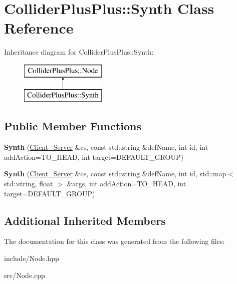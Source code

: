 \hypertarget{classColliderPlusPlus_1_1Synth}{\section{Collider\-Plus\-Plus\-:\-:Synth Class Reference}
\label{classColliderPlusPlus_1_1Synth}
}
Inheritance diagram for Collider\-Plus\-Plus\-:\-:Synth\-:\begin{figure}[H]
\begin{center}
\leavevmode
\includegraphics[height=2.000000cm]{classColliderPlusPlus_1_1Synth}
\end{center}
\end{figure}
\subsection*{Public Member Functions}
\begin{DoxyCompactItemize}
\item 
\hypertarget{classColliderPlusPlus_1_1Synth_ac3f806d2e0109543b2e511a7b5b2fe79}{{\bfseries Synth} (\hyperlink{classColliderPlusPlus_1_1Client__Server}{Client\-\_\-\-Server} \&cs, const std\-::string \&def\-Name, int id, int add\-Action=T\-O\-\_\-\-H\-E\-A\-D, int target=D\-E\-F\-A\-U\-L\-T\-\_\-\-G\-R\-O\-U\-P)}\label{classColliderPlusPlus_1_1Synth_ac3f806d2e0109543b2e511a7b5b2fe79}

\item 
\hypertarget{classColliderPlusPlus_1_1Synth_adf2410b3751b1aac52f3c8245f93f822}{{\bfseries Synth} (\hyperlink{classColliderPlusPlus_1_1Client__Server}{Client\-\_\-\-Server} \&cs, const std\-::string \&def\-Name, int id, std\-::map$<$ std\-::string, float $>$ \&args, int add\-Action=T\-O\-\_\-\-H\-E\-A\-D, int target=D\-E\-F\-A\-U\-L\-T\-\_\-\-G\-R\-O\-U\-P)}\label{classColliderPlusPlus_1_1Synth_adf2410b3751b1aac52f3c8245f93f822}

\end{DoxyCompactItemize}
\subsection*{Additional Inherited Members}


The documentation for this class was generated from the following files\-:\begin{DoxyCompactItemize}
\item 
include/Node.\-hpp\item 
src/Node.\-cpp\end{DoxyCompactItemize}
